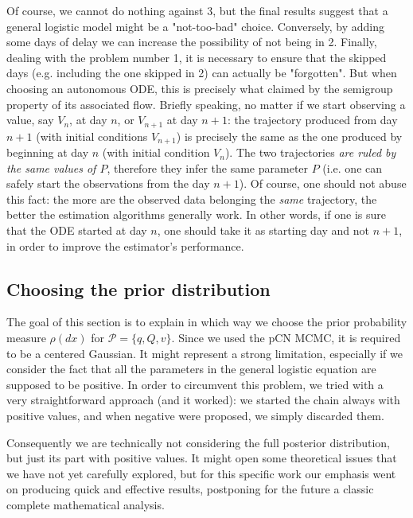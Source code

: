 \documentclass[8pt]{article}
\begin{document}
Of course, we cannot do nothing against $3$, but the final results suggest
that a general logistic model might be a "not-too-bad" choice.
Conversely, by adding some days of delay we can increase the
possibility of not being in 2.
Finally, dealing with the problem number 1,
it is necessary to ensure that the skipped days 
(e.g. including the one skipped in 2)
can actually be "forgotten".
But when choosing an autonomous ODE, this is precisely what
claimed by the semigroup property of its associated flow.
Briefly speaking,
no matter if we start observing a value, say $V_n$, at 
day $n$, or $V_{n+1}$ at day $n+1$: 
the trajectory produced from day $n+1$ (with initial
conditions $V_{n+1}$) is precisely the same as the one
produced by beginning at day $n$ (with initial condition $V_n$).
The two trajectories \emph{are ruled by the same values of $P$},
therefore they infer the same parameter $P$ (i.e. one can safely
start the observations from the day $n+1$).
Of course, one should not abuse this fact:
the more are the observed data belonging the \emph{same}
trajectory, the better the estimation algorithms generally work.
In other words, if one is sure that the ODE started at day $n$,
one should take it as starting day and not $n+1$, in order to
improve the estimator's performance.


\subsection{Choosing the prior distribution}
The goal of this section is to explain in which way we choose the
prior probability measure $\rho(dx)$ for $\mathcal{P} = \{q, Q, v\}$.
Since we used the pCN MCMC, it is required to be a centered Gaussian. 
It might represent
a strong limitation, especially if we consider the fact
that all the parameters in the general logistic equation
are supposed to be positive. In order to circumvent this problem,
we tried with a very straightforward approach (and it worked):
we started the chain always with positive values,
and when negative were proposed, we simply discarded them.


Consequently we are technically not considering the full posterior
distribution, but just its part with positive values. It might open
some theoretical issues that we have not yet carefully explored,
but for this specific work our emphasis went on producing quick
and effective results, postponing for the future a classic complete
mathematical analysis.
\end{document}

